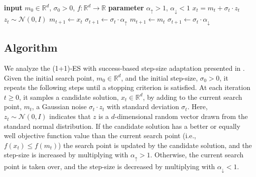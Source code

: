 \documentclass[journal]{IEEEtran}
\providecommand{\R}{\mathbb{R}} %
\renewcommand{\geq}{\geqslant} %
\renewcommand{\leq}{\leqslant} %
\theoremstyle{definition}
\newcommand{\aup}{\alpha_{\uparrow}}
\newcommand{\adown}{\alpha_{\downarrow}}
\begin{document}
\begin{algorithm}[H]
\caption{(1+1)-ES with success-based $\sigma$-adaptation}
\label{algo}
\begin{algorithmic}[1]
\State \textbf{input} $m_0 \in \mathbb{R}^d$, $\sigma_0 > 0$, $f: \R^d \to \R$
\State \textbf{parameter} $\aup > 1$, $\adown < 1$
\State $x_t = m_t + \sigma_t \cdot z_t$  $z_t \sim \mathcal{N}(0,  I)$
\If {$f\big(x_t\big) \leq f\big(m_t\big)$}
\State $m_{t+1} \leftarrow x_t$
\State $\sigma_{t+1} \leftarrow \sigma_t \cdot \aup$
\Else
\State $m_{t+1} \leftarrow m_t$
\State $\sigma_{t+1} \leftarrow \sigma_t \cdot \adown$
\EndIf
\EndFor
\end{algorithmic}
\end{algorithm}

\subsection{Algorithm}


We analyze the (1+1)-ES with success-based step-size adaptation \cite{kern2004learning} presented in . 
Given the initial search point, $m_0 \in \R^d$, and the initial step-size, $\sigma_0 > 0$, it repeats the following steps until a stopping criterion is satisfied. At each iteration $t \geq 0$, it samples a candidate solution, $x_t \in \R^d$, by adding to the current search point, $m_t$, a Gaussian noise $\sigma_t \cdot z_t$ with standard deviation $\sigma_t$. Here, $z_t \sim \mathcal{N}(0, I)$ indicates that $z$ is a $d$-dimensional random vector drawn from the standard normal distribution. If the candidate solution has a better or equally well objective function value than the current search point (i.e., $f(x_t) \leq f(m_t)$) the search point is updated by the candidate solution, and the step-size is increased by multiplying with $\aup > 1$. Otherwise, the current search point is taken over, and the step-size is decreased by multiplying with $\adown < 1$. 
\end{document}
